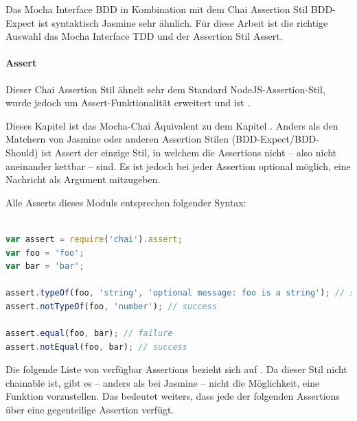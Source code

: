 Das Mocha Interface BDD in Kombination mit dem Chai Assertion Stil BDD-Expect ist syntaktisch Jasmine sehr ähnlich. Für diese Arbeit ist die richtige Auswahl das Mocha Interface TDD und der Assertion Stil Assert.

\paragraph{Assert}
Dieser Chai Assertion Stil ähnelt sehr dem Standard NodeJS-Assertion-Stil, wurde jedoch um Assert-Funktionalität erweitert und ist  \autocite{Chai:AssertBrowser}.

Dieses Kapitel ist das Mocha-Chai Äquivalent zu dem Kapitel . Anders als den Matchern von Jasmine oder anderen Assertion Stilen (BDD-Expect/BDD-Should) ist Assert der einzige Stil, in welchem die Assertions nicht  -- also nicht aneinander kettbar -- sind. Es ist jedoch bei jeder Assertion optional möglich, eine Nachricht als Argument mitzugeben.

\newpage
Alle Asserts dieses Moduls entsprechen folgender Syntax:
\begin{lstlisting}[language=JavaScript]

var assert = require('chai').assert;
var foo = 'foo'; 
var bar = 'bar';

assert.typeOf(foo, 'string', 'optional message: foo is a string'); // success
assert.notTypeOf(foo, 'number'); // success

assert.equal(foo, bar); // failure
assert.notEqual(foo, bar); // success

\end{lstlisting}

Die folgende Liste von verfügbar Assertions bezieht sich auf \cite{Chai:Assert}. Da dieser Stil nicht chainable ist, gibt es -- anders als bei Jasmine -- nicht die Möglichkeit, eine  Funktion vorzustellen. Das bedeutet weiters, dass jede der folgenden Assertions über eine gegenteilige Assertion verfügt.

